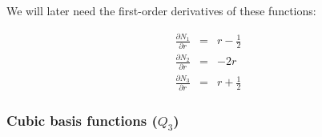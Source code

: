 We will later need the first-order derivatives of these functions:
\begin{mdframed}[backgroundcolor=blue!5]
\begin{eqnarray}
\frac{\partial N_1}{\partial r} &=& r-\frac{1}{2} \nonumber\\
\frac{\partial N_2}{\partial r} &=& -2r \nonumber\\ 
\frac{\partial N_3}{\partial r} &=& r+\frac{1}{2}
\end{eqnarray}
\end{mdframed}


\subsubsection{Cubic basis functions ($Q_3$) \label{sec:bf3}}

